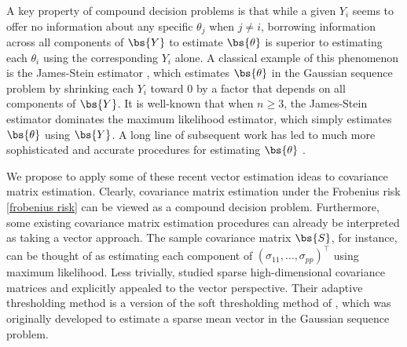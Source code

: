 A key property of compound decision problems is that while a given $Y_i$ seems to offer no information about any specific $\theta_j$ when $j \ne i$, borrowing information across all components of $\bs{Y}$ to estimate $\bs{\theta}$ is superior to estimating each $\theta_i$ using the corresponding $Y_i$ alone. A classical example of this phenomenon is the James-Stein estimator \citep{james1961estimation}, which estimates $\bs{\theta}$ in the Gaussian sequence problem by shrinking each $Y_i$ toward $0$ by a factor that depends on all components of $\bs{Y}$. It is well-known that when $n \geq 3$, the James-Stein estimator 
dominates the maximum likelihood estimator, which simply estimates $\bs{\theta}$ using $\bs{Y}$. A long line of subsequent work has led to much more sophisticated and accurate procedures for estimating $\bs{\theta}$ \citep{brown2009nonparametric, jiang2009general, johnstone2017gaussian, lindley1962discussion, fourdrinier2018shrinkage}.



We propose to apply some of these recent vector estimation ideas to covariance matrix estimation. Clearly, covariance matrix estimation under the Frobenius risk \eqref{frobenius risk} can be viewed as a compound decision problem. Furthermore, some existing covariance matrix estimation procedures can already be interpreted as taking a vector approach. The sample covariance matrix $\bs{S}$, for instance, can be thought of as estimating each component of $(\sigma_{11},\ldots,\sigma_{pp})^\top$ using maximum likelihood. Less trivially, \citet{cai2011adaptive} studied sparse high-dimensional covariance matrices and explicitly appealed to the vector perspective. Their adaptive thresholding method is a version of the soft thresholding method of \citet{donoho1995adapting}, which was originally developed to estimate a sparse mean vector in the Gaussian sequence problem.

